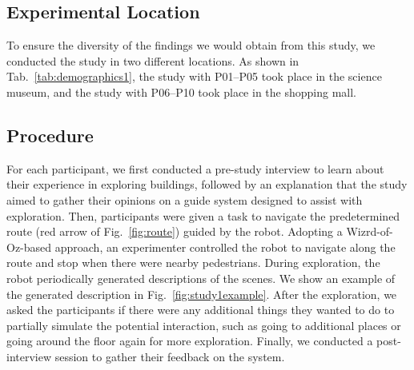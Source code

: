 

\subsection{Experimental Location}
To ensure the diversity of the findings we would obtain from this study, we conducted the study in two different locations. 
As shown in Tab.~\ref{tab:demographics1}, the study with P01--P05 took place in the science museum, and the study with P06--P10 took place in the shopping mall.

\subsection{Procedure}
For each participant, we first conducted a pre-study interview to learn about their experience in exploring buildings, followed by an explanation that the study aimed to gather their opinions on a guide system designed to assist with exploration.
Then, participants were given a task to navigate the predetermined route (red arrow of Fig.~\ref{fig:route}) guided by the robot.
Adopting a Wizrd-of-Oz-based approach, an experimenter controlled the robot to navigate along the route and stop when there were nearby pedestrians. 
During exploration, the robot periodically generated descriptions of the scenes. 
We show an example of the generated description in Fig.~\ref{fig:study1example}.
After the exploration, we asked the participants if there were any additional things they wanted to do to partially simulate the potential interaction, such as going to additional places or going around the floor again for more exploration.
Finally, we conducted a post-interview session to gather their feedback on the system. 


